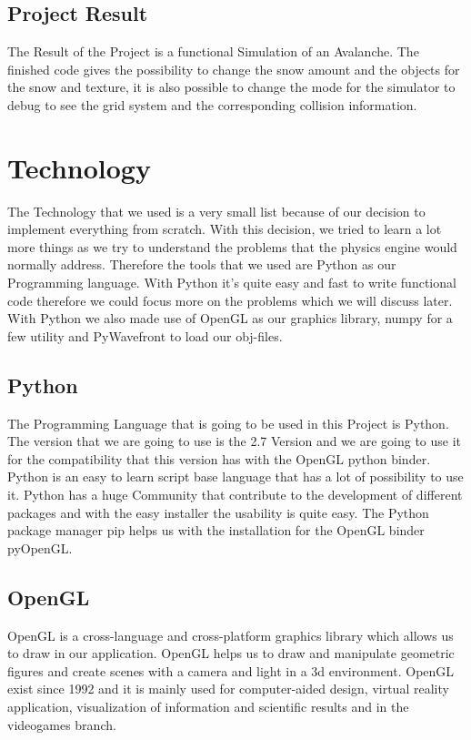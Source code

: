 \documentclass{sig-alternate-05-2015}
\begin{document}
\subsection{Project Result}
The Result of the Project is a functional Simulation of an Avalanche. The finished code gives the possibility to change the snow amount and the objects for the snow and texture, it is also possible to change the mode for the simulator to debug to see the grid system and the corresponding collision information. 
\section{Technology}
The Technology that we used is a very small list because of our decision to implement everything from scratch. With this decision, we tried to learn a lot more things as we try to understand the problems that the physics engine would normally address. Therefore the tools that we used are Python as our Programming language. With Python it's quite easy and fast to write functional code therefore we could focus more on the problems which we will discuss later. With Python we also made use of OpenGL as our graphics library, numpy for a few utility and PyWavefront to load our obj-files.
\subsection{Python}
The Programming Language that is going to be used in this Project is Python. The version that we are going to use is the 2.7 Version and we are going to use it for the compatibility that this version has with the OpenGL python binder. Python is an easy to learn script base language that has a lot of possibility to use it. Python has a huge Community that contribute to the development of different packages and with the easy installer the usability is quite easy. The Python package manager pip helps us with the installation for the OpenGL binder pyOpenGL.
\subsection{OpenGL}
OpenGL is a cross-language and cross-platform graphics library which allows us to draw in our application. OpenGL helps us to draw and manipulate geometric figures and create scenes with a camera and light in a 3d environment. OpenGL exist since 1992 and it is mainly used for computer-aided design, virtual reality application, visualization of information and scientific results and in the videogames branch.
\end{document}
